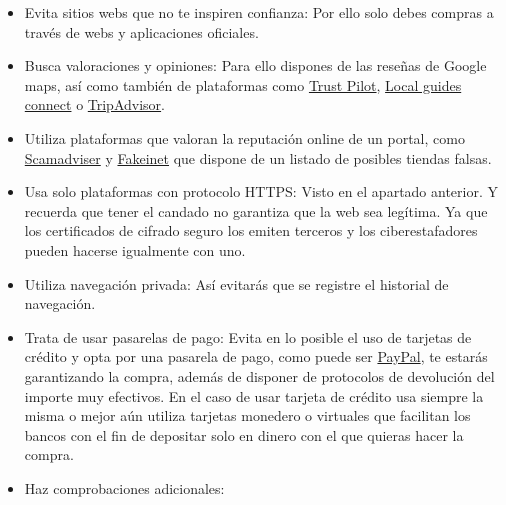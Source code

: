 \documentclass[
  spanish,
  a4paper,
  openany]{book}
\begin{document}
\begin{itemize}
\item
  Evita sitios webs que no te inspiren confianza: Por ello solo debes compras a través de webs y aplicaciones oficiales.
\item
  Busca valoraciones y opiniones: Para ello dispones de las reseñas de Google maps, así como también de plataformas como \href{https://es.trustpilot.com/}{Trust Pilot}, \href{https://www.localguidesconnect.com/}{Local guides connect} o \href{https://www.tripadvisor.es/}{TripAdvisor}.
\item
  Utiliza plataformas que valoran la reputación online de un portal, como \href{https://www.scamadviser.com/}{Scamadviser} y \href{https://fakeinet.com/}{Fakeinet} que dispone de un listado de posibles tiendas falsas.
\item
  Usa solo plataformas con protocolo HTTPS: Visto en el apartado anterior. Y recuerda que tener el candado no garantiza que la web sea legítima. Ya que los certificados de cifrado seguro los emiten terceros y los ciberestafadores pueden hacerse igualmente con uno.
\item
  Utiliza navegación privada: Así evitarás que se registre el historial de navegación.
\item
  Trata de usar pasarelas de pago: Evita en lo posible el uso de tarjetas de crédito y opta por una pasarela de pago, como puede ser \href{https://www.paypal.com/es/home}{PayPal}, te estarás garantizando la compra, además de disponer de protocolos de devolución del importe muy efectivos. En el caso de usar tarjeta de crédito usa siempre la misma o mejor aún utiliza tarjetas monedero o virtuales que facilitan los bancos con el fin de depositar solo en dinero con el que quieras hacer la compra.
\item
  Haz comprobaciones adicionales:


\end{itemize}
\end{document}
